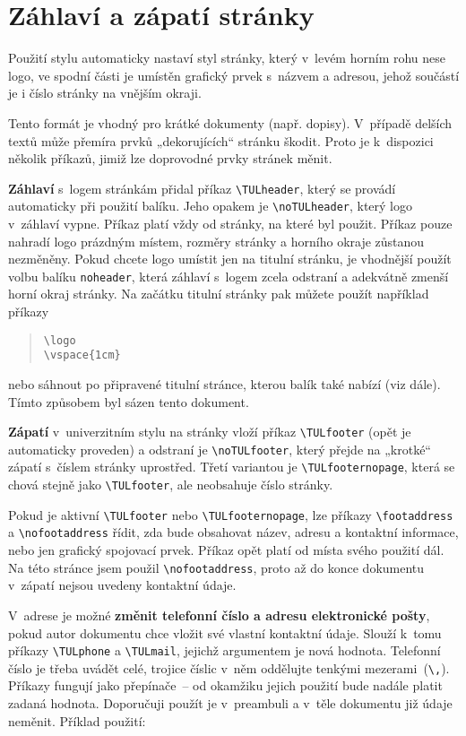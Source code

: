 \documentclass[a4paper,12pt,twoside]{article}
\newcommand{\cmdfont}[1]{\texttt{\color{\tulcolor}#1}}
\newcommand{\cmd}[1]{\cmdfont{\textbackslash #1}}
\begin{document}
\section{Záhlaví a zápatí stránky}

Použití stylu automaticky nastaví styl stránky, který v~levém horním rohu nese
logo, ve spodní části je umístěn grafický prvek s~názvem a adresou, jehož
součástí je i číslo stránky na vnějším okraji.

Tento formát je vhodný pro krátké dokumenty (např. dopisy). V~případě delších
textů může přemíra prvků „dekorujících“ stránku škodit. Proto je k~dispozici
několik příkazů, jimiž lze doprovodné prvky stránek měnit.

\textbf{Záhlaví} s~logem stránkám přidal příkaz \cmd{TULheader}, který se
provádí automaticky při použití balíku. Jeho opakem je \cmd{noTULheader}, který
logo v~záhlaví vypne. Příkaz platí vždy od stránky, na které byl použit. Příkaz
pouze nahradí logo prázdným místem, rozměry stránky a horního okraje zůstanou
nezměněny. Pokud chcete logo umístit jen na titulní stránku, je vhodnější
použít volbu balíku \cmdfont{noheader}, která záhlaví s~logem zcela odstraní a
adekvátně zmenší horní okraj stránky. Na začátku titulní stránky pak můžete
použít například příkazy

\begin{quote}
\cmd{logo}\\
\cmd{vspace\{1cm\}}
\end{quote}

nebo sáhnout po připravené titulní stránce, kterou balík také nabízí (viz
dále). Tímto způsobem byl sázen tento dokument.

\textbf{Zápatí} v~univerzitním stylu na stránky vloží příkaz \cmd{TULfooter}
(opět je automaticky proveden) a odstraní je \cmd{noTULfooter}, který přejde na
„krotké“ zápatí s~číslem stránky uprostřed. Třetí variantou je
\cmd{TULfooternopage}, která se chová stejně jako \cmd{TULfooter}, ale
neobsahuje číslo stránky.

Pokud je aktivní \cmd{TULfooter} nebo \cmd{TULfooternopage}, lze příkazy
\cmd{footaddress} a \cmd{nofootaddress} řídit, zda bude obsahovat název, adresu
a kontaktní informace, nebo jen grafický spojovací prvek. Příkaz opět platí od
místa svého použití dál. Na této stránce jsem použil \cmd{nofootaddress}, proto
až do konce dokumentu v~zápatí nejsou uvedeny kontaktní údaje.
\nofootaddress

V~adrese je možné \textbf{změnit telefonní číslo a adresu elektronické pošty},
pokud autor dokumentu chce vložit své vlastní kontaktní údaje. Slouží k~tomu
příkazy \cmd{TULphone} a \cmd{TULmail}, jejichž argumentem je nová hodnota.
Telefonní číslo je třeba uvádět celé, trojice číslic v~něm oddělujte tenkými
mezerami~(\cmd{,}). Příkazy fungují jako přepínače~-- od okamžiku jejich
použití bude nadále platit zadaná hodnota. Doporučuji použít je v~preambuli a
v~těle dokumentu již údaje neměnit. Příklad použití:
\end{document}
